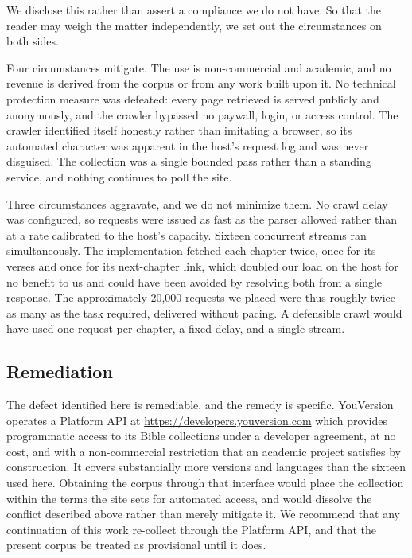 We disclose this rather than assert a compliance we do not have. So that the
reader may weigh the matter independently, we set out the circumstances on both
sides.

Four circumstances mitigate. The use is non-commercial and academic, and no
revenue is derived from the corpus or from any work built upon it. No technical
protection measure was defeated: every page retrieved is served publicly and
anonymously, and the crawler bypassed no paywall, login, or access control. The
crawler identified itself honestly rather than imitating a browser, so its
automated character was apparent in the host's request log and was never
disguised. The collection was a single bounded pass rather than a standing
service, and nothing continues to poll the site.

Three circumstances aggravate, and we do not minimize them. No crawl delay was
configured, so requests were issued as fast as the parser allowed rather than at
a rate calibrated to the host's capacity. Sixteen concurrent streams ran
simultaneously. The implementation fetched each chapter twice, once for its
verses and once for its next-chapter link, which doubled our load on the host
for no benefit to us and could have been avoided by resolving both from a single
response. The approximately 20,000 requests we placed were thus roughly twice as
many as the task required, delivered without pacing. A defensible crawl would
have used one request per chapter, a fixed delay, and a single stream.

\subsection{Remediation}

The defect identified here is remediable, and the remedy is specific. YouVersion
operates a Platform API at \url{https://developers.youversion.com} which provides
programmatic access to its Bible collections under a developer agreement, at no
cost, and with a non-commercial restriction that an academic project satisfies by
construction. It covers substantially more versions and languages than the
sixteen used here. Obtaining the corpus through that interface would place the
collection within the terms the site sets for automated access, and would
dissolve the conflict described above rather than merely mitigate it. We
recommend that any continuation of this work re-collect through the Platform API,
and that the present corpus be treated as provisional until it does.
